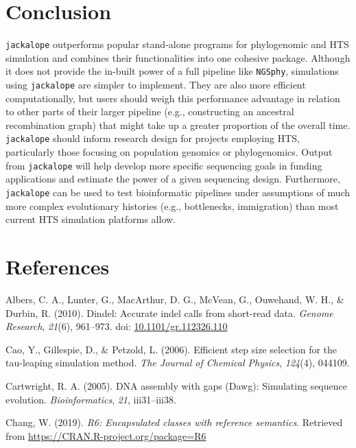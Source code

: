 \documentclass[12pt,]{article}
\begin{document}
\hypertarget{conclusion}{%
\section{Conclusion}\label{conclusion}}

\texttt{jackalope} outperforms popular stand-alone programs for phylogenomic and HTS
simulation and combines their functionalities into one cohesive package.
Although it does not provide the in-built power of a full pipeline like \texttt{NGSphy},
simulations using \texttt{jackalope} are simpler to implement.
They are also more efficient computationally, but users should weigh this performance
advantage in relation to other parts of their larger pipeline (e.g.,
constructing an ancestral recombination graph) that might take up a greater
proportion of the overall time.
\texttt{jackalope} should inform research design for projects employing HTS,
particularly those focusing on population genomics or phylogenomics.
Output from \texttt{jackalope} will help develop more specific sequencing goals
in funding applications and estimate the power of a given sequencing design.
Furthermore, \texttt{jackalope} can be used to test bioinformatic pipelines under
assumptions of much more complex evolutionary histories (e.g., bottlenecks, immigration)
than most current HTS simulation platforms allow.

\section*{References}


\hypertarget{refs}{}
\leavevmode\hypertarget{ref-Albers_2010}{}%
Albers, C. A., Lunter, G., MacArthur, D. G., McVean, G., Ouwehand, W. H., \& Durbin, R. (2010). Dindel: Accurate indel calls from short-read data. \emph{Genome Research}, \emph{21}(6), 961--973. doi: \href{https://doi.org/10.1101/gr.112326.110}{10.1101/gr.112326.110}

\leavevmode\hypertarget{ref-Cao_2006}{}%
Cao, Y., Gillespie, D., \& Petzold, L. (2006). Efficient step size selection for the tau-leaping simulation method. \emph{The Journal of Chemical Physics}, \emph{124}(4), 044109.

\leavevmode\hypertarget{ref-Cartwright_2005}{}%
Cartwright, R. A. (2005). DNA assembly with gaps (Dawg): Simulating sequence evolution. \emph{Bioinformatics}, \emph{21}, iii31--iii38.

\leavevmode\hypertarget{ref-Chang_2019}{}%
Chang, W. (2019). \emph{R6: Encapsulated classes with reference semantics}. Retrieved from \url{https://CRAN.R-project.org/package=R6}
\end{document}
